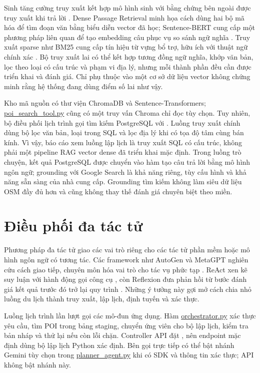 Sinh tăng cường truy xuất kết hợp mô hình sinh với bằng chứng bên ngoài được truy xuất khi trả lời \cite{lewis2020retrieval}. Dense Passage Retrieval minh họa cách dùng hai bộ mã hóa để tìm đoạn văn bằng biểu diễn vector đã học; Sentence-BERT cung cấp một phương pháp liên quan để tạo embedding câu phục vụ so sánh ngữ nghĩa \cite{karpukhin2020dense,reimers2019sentence}. Truy xuất sparse như BM25 cung cấp tín hiệu từ vựng bổ trợ, hữu ích với thuật ngữ chính xác \cite{robertson2009probabilistic}. Bộ truy xuất lai có thể kết hợp tương đồng ngữ nghĩa, khớp văn bản, lọc theo loại có cấu trúc và phạm vi địa lý, nhưng mỗi thành phần đều cần được triển khai và đánh giá. Chỉ phụ thuộc vào một cơ sở dữ liệu vector không chứng minh rằng hệ thống đang dùng điểm số lai như vậy.

Kho mã nguồn có thư viện ChromaDB và Sentence-Transformers; \url{poi_search_tool.py} cũng có một truy vấn Chroma chỉ đọc tùy chọn. Tuy nhiên, bộ điều phối lịch trình gọi tìm kiếm PostgreSQL với . Luồng truy xuất chính dùng bộ lọc văn bản, loại trong SQL và lọc địa lý khi có tọa độ tâm cùng bán kính. Vì vậy, báo cáo xem luồng lập lịch là truy xuất SQL có cấu trúc, không phải một pipeline RAG vector dense đã triển khai mặc định. Trong luồng trò chuyện, kết quả PostgreSQL được chuyển vào hàm tạo câu trả lời bằng mô hình ngôn ngữ; grounding với Google Search là khả năng riêng, tùy cấu hình và khả năng sẵn sàng của nhà cung cấp. Grounding tìm kiếm không làm siêu dữ liệu OSM đầy đủ hơn và cũng không thay thế đánh giá chuyên biệt theo miền.

\section{Điều phối đa tác tử}

Phương pháp đa tác tử giao các vai trò riêng cho các tác tử phần mềm hoặc mô hình ngôn ngữ có tương tác. Các framework như AutoGen và MetaGPT nghiên cứu cách giao tiếp, chuyên môn hóa vai trò cho tác vụ phức tạp \cite{wu2023autogen,hong2023metagpt}. ReAct xen kẽ suy luận với hành động gọi công cụ \cite{yao2023react}, còn Reflexion đưa phản hồi từ bước đánh giá kết quả trước đó trở lại quy trình \cite{shinn2023reflexion}. Những ý tưởng này gợi mở cách chia nhỏ luồng du lịch thành truy xuất, lập lịch, định tuyến và xác thực.

Luồng lịch trình lần lượt gọi các mô-đun ứng dụng. Hàm \url{orchestrator.py} xác thực yêu cầu, tìm POI trong bảng staging, chuyển ứng viên cho bộ lập lịch, kiểm tra bản nháp và thử lại nếu còn lỗi chặn. Controller API đặt , nên endpoint mặc định dùng bộ lập lịch Python xác định. Bên gọi trực tiếp có thể bật nhánh Gemini tùy chọn trong \url{planner_agent.py} khi có SDK và thông tin xác thực; API không bật nhánh này.

